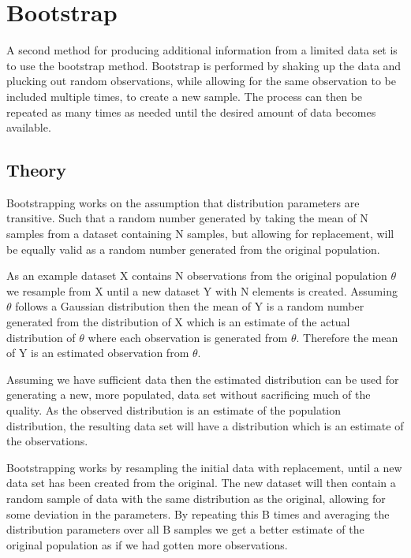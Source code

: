\section{Bootstrap}\label{ch:bootstrap}

A second method for producing additional information from a limited data set is to use the bootstrap method. Bootstrap is performed by shaking up the data and plucking out random observations, while allowing for the same observation to be included multiple times, to create a new sample. The process can then be repeated as many times as needed until the desired amount of data becomes available. 

\subsection{Theory}

Bootstrapping works on the assumption that distribution parameters are transitive. Such that a random number generated by taking the mean of N samples from a dataset containing N samples, but allowing for replacement, will be equally valid as a random number generated from the original population.

As an example dataset X contains N observations from the original population $\theta$ we resample from X until a new dataset Y with N elements is created. Assuming $\theta$ follows a Gaussian distribution then the mean of Y is a random number generated from the distribution of X which is an estimate of the actual distribution of $\theta$ where each observation is generated from $\theta$. Therefore the mean of Y is an estimated observation from $\theta$.

Assuming we have sufficient data then the estimated distribution can be used for generating a new, more populated, data set without sacrificing much of the quality. As the observed distribution is an estimate of the population distribution, the resulting data set will have a distribution which is an estimate of the observations.

\iffalse %
Bootstrapping works by resampling the initial data with replacement, until a new data set has been created from the original. The new dataset will then contain a random sample of data with the same distribution as the original, allowing for some deviation in the parameters. By repeating this B times and averaging the distribution parameters over all B samples we get a better estimate of the original population as if we had gotten more observations.

